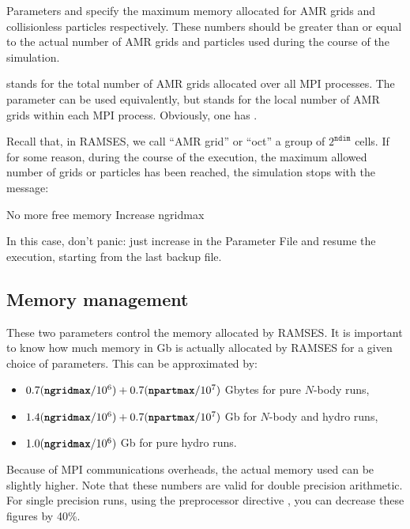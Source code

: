 
Parameters  and  specify the
maximum memory allocated for AMR grids and collisionless particles
respectively. These numbers should be greater than or equal to the
actual number of AMR grids and particles used during the course of the
simulation. 

 stands for the total number of AMR grids allocated
over all MPI processes. The  parameter can be used
equivalently, but stands for the local number of AMR grids within each
MPI process. Obviously, one has .

\begin{warning}
Recall that, in RAMSES, we call ``AMR grid'' or ``oct'' a group of
$2^{\mathtt{ndim}}$ cells. If for some reason, during the course of the
execution, the maximum allowed number of grids or particles has been
reached, the simulation stops with the message:
%
\begin{Prompt}
 No more free memory
 Increase ngridmax
\end{Prompt}
%
In this case, don't panic: just increase  in the
Parameter File and resume the execution, starting from the last backup
file. 
\end{warning}


\subsection{Memory management}

These two parameters control the memory allocated by RAMSES. It is
important to know how much memory in Gb is actually allocated by RAMSES
for a given choice of parameters. This can be approximated by:

\begin{itemize}
\item $0.7 (\nmlentry{ngridmax}/10^6) + 0.7 (\nmlentry{npartmax}/10^7)$
Gbytes for pure $N$-body runs,
\item $1.4 (\nmlentry{ngridmax}/10^6) + 0.7 (\nmlentry{npartmax}/10^7)$
Gb for $N$-body and hydro runs,
\item $1.0 (\nmlentry{ngridmax}/10^6)$ Gb for pure hydro runs. 
\end{itemize}

Because of MPI communications overheads, the actual memory used can be
slightly higher. Note that these numbers are valid for double precision
arithmetic. For single precision runs, using the preprocessor directive
, you can decrease these figures by 40\%. 

